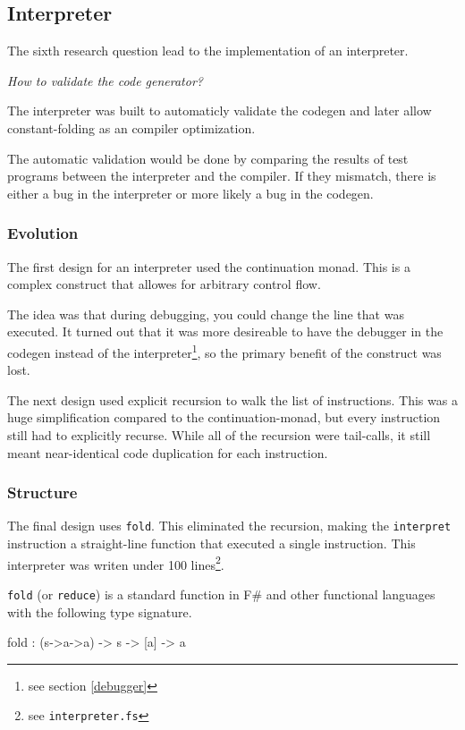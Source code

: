 \subsection{Interpreter}
The sixth research question lead to the implementation of an interpreter.

\textit{How to validate the code generator?}

The interpreter was built to automaticly validate the codegen and later allow constant-folding as an compiler optimization.

The automatic validation would be done by comparing the results of test programs between the interpreter and the compiler.
If they mismatch, there is either a bug in the interpreter or more likely a bug in the codegen.

\subsubsection{Evolution}
The first design for an interpreter used the continuation monad.
This is a complex construct that allowes for arbitrary control flow.

The idea was that during debugging, you could change the line that was executed.
It turned out that it was more desireable to have the debugger in the codegen instead of the interpreter\footnote{see section \ref{debugger}}, so the primary benefit of the construct was lost.

The next design used explicit recursion to walk the list of instructions.
This was a huge simplification compared to the continuation-monad, but every instruction still had to explicitly recurse.
While all of the recursion were tail-calls, it still meant near-identical code duplication for each instruction.

\subsubsection{Structure}
The final design uses \verb|fold|.
This eliminated the recursion, making the \verb|interpret| instruction a straight-line function that executed a single instruction.
This interpreter was writen under 100 lines\footnote{see \texttt{interpreter.fs}}.

\verb|fold| (or \verb|reduce|) is a standard function in F\# and other functional languages with the following type signature.

\begin{FS}
    fold : (s->a->a) -> s -> [a] -> a
\end{FS}


